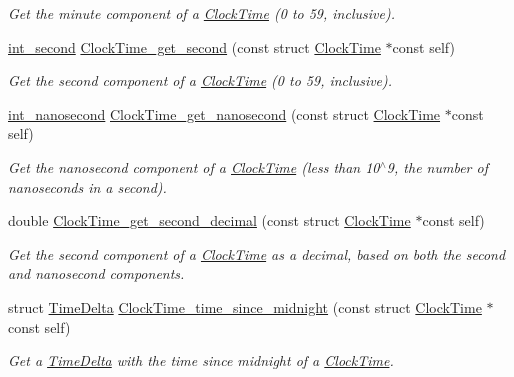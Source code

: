 \begin{DoxyCompactItemize}
\begin{DoxyCompactList}\small\item\em \-Get the minute component of a \hyperlink{structClockTime}{\-Clock\-Time} (0 to 59, inclusive). \end{DoxyCompactList}\item 
\hyperlink{types_8h_abd3494f4b69b446ec1fc0477a8b769c9}{int\-\_\-second} \hyperlink{clock-time_8h_a77c448c2991009dbcb662696a7ceedca}{\-Clock\-Time\-\_\-get\-\_\-second} (const struct \hyperlink{structClockTime}{\-Clock\-Time} $\ast$const self)
\begin{DoxyCompactList}\small\item\em \-Get the second component of a \hyperlink{structClockTime}{\-Clock\-Time} (0 to 59, inclusive). \end{DoxyCompactList}\item 
\hyperlink{types_8h_a153ef9bf3a8448179ab1d606f5593b4c}{int\-\_\-nanosecond} \hyperlink{clock-time_8h_ad74a9b1b36f0fd4b4a739b69fb65869e}{\-Clock\-Time\-\_\-get\-\_\-nanosecond} (const struct \hyperlink{structClockTime}{\-Clock\-Time} $\ast$const self)
\begin{DoxyCompactList}\small\item\em \-Get the nanosecond component of a \hyperlink{structClockTime}{\-Clock\-Time} (less than 10$^\wedge$9, the number of nanoseconds in a second). \end{DoxyCompactList}\item 
double \hyperlink{clock-time_8h_a7cf42452da58eb906b00e92fe3efb159}{\-Clock\-Time\-\_\-get\-\_\-second\-\_\-decimal} (const struct \hyperlink{structClockTime}{\-Clock\-Time} $\ast$const self)
\begin{DoxyCompactList}\small\item\em \-Get the second component of a \hyperlink{structClockTime}{\-Clock\-Time} as a decimal, based on both the second and nanosecond components. \end{DoxyCompactList}\item 
struct \hyperlink{structTimeDelta}{\-Time\-Delta} \hyperlink{clock-time_8h_ace4db26641fe01b2edd311b09589ebbb}{\-Clock\-Time\-\_\-time\-\_\-since\-\_\-midnight} (const struct \hyperlink{structClockTime}{\-Clock\-Time} $\ast$const self)
\begin{DoxyCompactList}\small\item\em \-Get a \hyperlink{structTimeDelta}{\-Time\-Delta} with the time since midnight of a \hyperlink{structClockTime}{\-Clock\-Time}. \end{DoxyCompactList}\item 

\end{DoxyCompactItemize}

